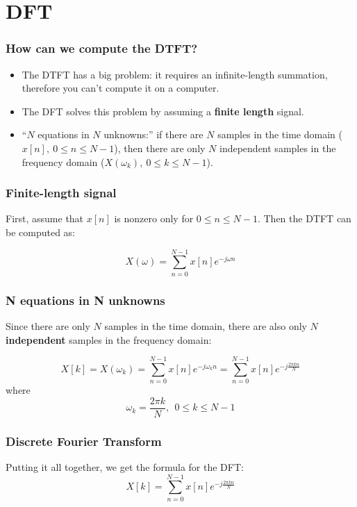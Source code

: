 \documentclass{beamer}
\begin{document}
\section[DFT]{DFT}
\setcounter{subsection}{1}

\begin{frame}
  \frametitle{How can we compute the DTFT?}

  \begin{itemize}
  \item
    The DTFT has a big problem: it requires an infinite-length
    summation, therefore you can't compute it on a computer.
  \item
    The DFT solves this problem by assuming a {\bf finite length}
    signal.
  \item
    ``$N$ equations in $N$ unknowns:'' if there are $N$ samples in the
    time domain ($x[n],~0\le n\le N-1$), then there are only $N$
    independent samples in the frequency domain ($X(\omega_k),~0\le
    k\le N-1$).
  \end{itemize}
\end{frame}

\begin{frame}
  \frametitle{Finite-length signal}

  First, assume that $x[n]$ is nonzero only for $0\le n\le N-1$.  Then
  the DTFT can be computed as:

  \begin{displaymath}
    X(\omega) = \sum_{n=0}^{N-1} x[n]e^{-j\omega n}
  \end{displaymath}
\end{frame}

\begin{frame}
  \frametitle{N equations in N  unknowns}

  Since there are only $N$ samples in the time domain, there are also
  only $N$ {\bf independent} samples in the frequency domain:

  \begin{displaymath}
    X[k] = X(\omega_k) = \sum_{n=0}^{N-1} x[n]e^{-j\omega_k n} = \sum_{n=0}^{N-1} x[n]e^{-j\frac{2\pi kn}{N}}
  \end{displaymath}
  where
  \begin{displaymath}
    \omega_k = \frac{2\pi k}{N},~~0\le k\le N-1
  \end{displaymath}
\end{frame}
    

\begin{frame}
  \frametitle{Discrete Fourier Transform}

  Putting it all together, we get the formula for the DFT:
  \begin{displaymath}
    X[k] = \sum_{n=0}^{N-1} x[n]e^{-j\frac{2\pi kn}{N}}
  \end{displaymath}
\end{frame}
    
\end{document}
